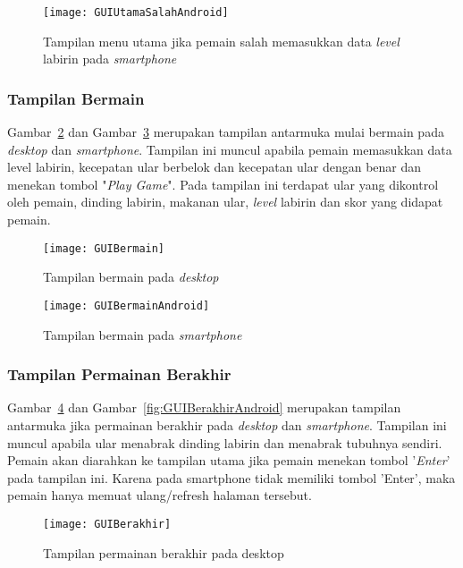 \begin{figure}[H]
	\centering  
	\texttt{[image: GUIUtamaSalahAndroid]}  
	\caption[Tampilan menu utama jika pemain salah memasukkan data \textit{level} labirin pada \textit{smartphone}]{Tampilan menu utama jika pemain salah memasukkan data \textit{level} labirin pada \textit{smartphone}}
	\label{fig:GUIUtamaSalahAndroid} 
\end{figure}

\subsubsection{Tampilan Bermain}
Gambar~\ref{fig:GUIBermain} dan Gambar~\ref{fig:GUIBermainAndroid} merupakan tampilan antarmuka mulai bermain pada \textit{desktop} dan \textit{smartphone}. Tampilan ini muncul apabila pemain memasukkan data level labirin, kecepatan ular berbelok dan kecepatan ular dengan benar dan menekan tombol "\textit{Play Game}". Pada tampilan ini terdapat ular yang dikontrol oleh pemain, dinding labirin, makanan ular, \textit{level} labirin dan skor yang didapat pemain.

\begin{figure}[H]
	\centering  
	\texttt{[image: GUIBermain]}  
	\caption[Tampilan bermain pada \textit{desktop}]{Tampilan bermain pada \textit{desktop}}
	\label{fig:GUIBermain} 
\end{figure}

\begin{figure}[H]
	\centering  
	\texttt{[image: GUIBermainAndroid]}  
	\caption[Tampilan bermain pada \textit{smartphone}]{Tampilan bermain pada \textit{smartphone}}
	\label{fig:GUIBermainAndroid} 
\end{figure}

\subsubsection{Tampilan Permainan Berakhir}
Gambar~\ref{fig:GUIBerakhir} dan Gambar~\ref{fig:GUIBerakhirAndroid} merupakan tampilan antarmuka jika permainan berakhir pada \textit{desktop} dan \textit{smartphone}. Tampilan ini muncul apabila ular menabrak dinding labirin dan menabrak tubuhnya sendiri. Pemain akan diarahkan ke tampilan utama jika pemain menekan tombol '\textit{Enter}' pada tampilan ini. Karena pada smartphone tidak memiliki tombol 'Enter', maka pemain hanya memuat ulang/refresh halaman tersebut.

\begin{figure}[H]
	\centering  
	\texttt{[image: GUIBerakhir]}  
	\caption[Tampilan permainan berakhir pada desktop]{Tampilan permainan berakhir pada desktop}
	\label{fig:GUIBerakhir} 
\end{figure}

